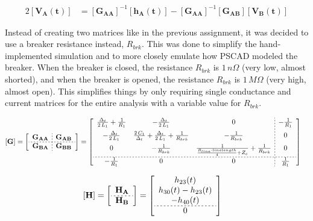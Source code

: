 \documentclass[10pt, oneside, letterpaper]{article}
\begin{document}
\begin{alignat}{2}
\left[\mathbf{V_A(t)}\right] &= \left[\mathbf{G_{AA}}\right]^{-1}\left[\mathbf{h_A(t)}\right] - \left[\mathbf{G_{AA}}\right]^{-1}\left[\mathbf{G_{AB}}\right]\left[\mathbf{V_B(t)}\right]
\end{alignat}

Instead of creating two matrices like in the previous assignment, it was decided to use a breaker resistance instead, $R_{brk}$. This was done to simplify the hand-implemented simulation and to more closely emulate how PSCAD modeled the breaker. When the breaker is closed, the resistance $R_{brk}$ is $1\,n\Omega$ (very low, almost shorted), and when the breaker is opened, the resistance $R_{brk}$ is $1\,M\Omega$ (very high, almost open). This simplifies things by only requiring single conductance and current matrices for the entire analysis with a variable value for $R_{brk}$.

\begin{alignat}{2}
  \left[
  \mathbf{G}\right] &= \left[
      \begin{array}{c;{2pt/2pt}c}
        \mathbf{G_{AA}} & \mathbf{G_{AB}} \\ \hdashline[2pt/2pt]
        \mathbf{G_{BA}} & \mathbf{G_{BB}} 
      \end{array}
    \right] = \left[\begin{array}{ccc;{2pt/2pt}c} \frac{\Delta_{t}}{2\,L_{1}}+\frac{1}{R_{1}} & -\frac{\Delta_{t}}{2\,L_{1}} & 0 & -\frac{1}{R_{1}}\\ [6pt]
    -\frac{\Delta_{t}}{2\,L_{1}} & \frac{2\,C_{1}}{\Delta_{t}}+\frac{\Delta_{t}}{2\,L_{1}}+\frac{1}{R_{brk}} & -\frac{1}{R_{brk}} & 0\\ [6pt]
    0 & -\frac{1}{R_{brk}} & \frac{1}{\frac{R_{line}\cdot{}linelength}{4}+Z_c}+\frac{1}{R_{brk}} & 0\\ [6pt] \hdashline[2pt/2pt]
    -\frac{1}{R_{1}} & 0 & 0 & \frac{1}{R_{1}} \end{array}\right]
\end{alignat}

\begin{alignat}{2}
  \left[\mathbf{H}\right] &= \left[\begin{array}{c} \mathbf{H_{A}} \\ \hdashline[2pt/2pt] \mathbf{H_{B}} \end{array}\right] = \left[\begin{array}{c} h_{23}(t) \\ h_{30}(t) - h_{23}(t) \\ -h_{40}(t) \\ \hdashline[2pt/2pt] 0 \end{array}\right]
\end{alignat}
\end{document}
